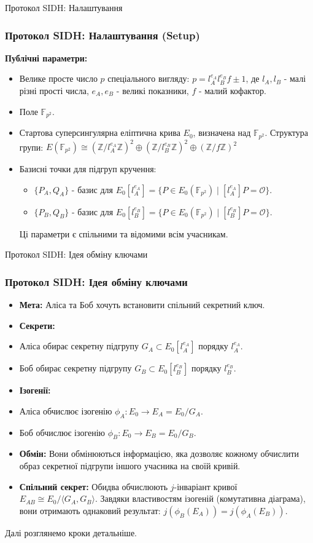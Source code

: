 \documentclass[9pt]{beamer}
\begin{document}
\begin{darkframes}
\begin{frame}{Протокол SIDH: Налаштування}
  \frametitle{Протокол SIDH: Налаштування (Setup)}
  \textbf{Публічні параметри:}
  \begin{itemize}
    \item Велике просте число $p$ спеціального вигляду: $p = l_A^{e_A} l_B^{e_B} f \pm 1$, де $l_A, l_B$ - малі різні прості числа, $e_A, e_B$ - великі показники, $f$ - малий кофактор.
    \item Поле $\mathbb{F}_{p^2}$.
    \item Стартова суперсингулярна еліптична крива $E_0$, визначена над $\mathbb{F}_{p^2}$. Структура групи: $E(\mathbb{F}_{p^2}) \cong (\mathbb{Z}/l_A^{e_A}\mathbb{Z})^2 \oplus (\mathbb{Z}/l_B^{e_B}\mathbb{Z})^2 \oplus (\mathbb{Z} / f\mathbb{Z})^2$
    \item Базисні точки для підгруп кручення:
      \begin{itemize}
          \item $\{P_A, Q_A\}$ - базис для $E_0[l_A^{e_A}] = \{ P \in E_0(\mathbb{F}_{p^2}) \mid [l_A^{e_A}]P = \mathcal{O} \}$.
          \item $\{P_B, Q_B\}$ - базис для $E_0[l_B^{e_B}] = \{ P \in E_0(\mathbb{F}_{p^2}) \mid [l_B^{e_B}]P = \mathcal{O} \}$.
      \end{itemize}
      Ці параметри є спільними та відомими всім учасникам.
  \end{itemize}
\end{frame}


\begin{frame}{Протокол SIDH: Ідея обміну ключами}
 \frametitle{Протокол SIDH: Ідея обміну ключами}
  \begin{itemize}
      \item \textbf{Мета:} Аліса та Боб хочуть встановити спільний секретний ключ.
      \item \textbf{Секрети:}
          \item Аліса обирає секретну підгрупу $G_A \subset E_0[l_A^{e_A}]$ порядку $l_A^{e_A}$.
          \item Боб обирає секретну підгрупу $G_B \subset E_0[l_B^{e_B}]$ порядку $l_B^{e_B}$.
      \item \textbf{Ізогенії:}
          \item Аліса обчислює ізогенію $\phi_A: E_0 \to E_A = E_0 / G_A$.
          \item Боб обчислює ізогенію $\phi_B: E_0 \to E_B = E_0 / G_B$.
      \item \textbf{Обмін:} Вони обмінюються інформацією, яка дозволяє кожному обчислити образ секретної підгрупи іншого учасника на своїй кривій.
      \item \textbf{Спільний секрет:} Обидва обчислюють $j$-інваріант кривої $E_{AB} \cong E_0 / \langle G_A, G_B \rangle$. Завдяки властивостям ізогеній (комутативна діаграма), вони отримають однаковий результат: $j(\phi_B(E_A)) = j(\phi_A(E_B))$.
  \end{itemize}
  Далі розглянемо кроки детальніше.
\end{frame}


\end{darkframes}
\end{document}
